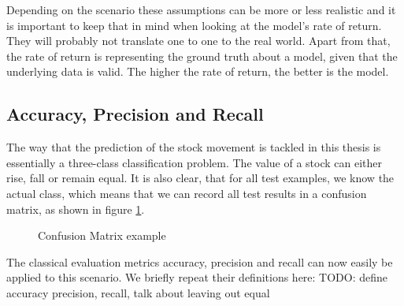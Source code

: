 Depending on the scenario these assumptions can be more or less realistic and it is important to keep that in mind when looking at the model's rate of return. They will probably not translate one to one to the real world. Apart from that, the rate of return is representing the ground truth about a model, given that the underlying data is valid. The higher the rate of return, the better is the model.

\subsection{Accuracy, Precision and Recall}
The way that the prediction of the stock movement is tackled in this thesis is essentially a three-class classification problem. The value of a stock can either rise, fall or remain equal. It is also clear, that for all test examples, we know the actual class, which means that we can record all test results in a confusion matrix, as shown in figure \ref{fig_confusionMatrix}.
\\
\begin{figure}[h]
\centering
{}
\label{fig_confusionMatrix}
\caption{Confusion Matrix example}
\end{figure}

The classical evaluation metrics accuracy, precision and recall can now easily be applied to this scenario. We briefly repeat their definitions here:
TODO: define accuracy precision, recall, talk about leaving out equal


